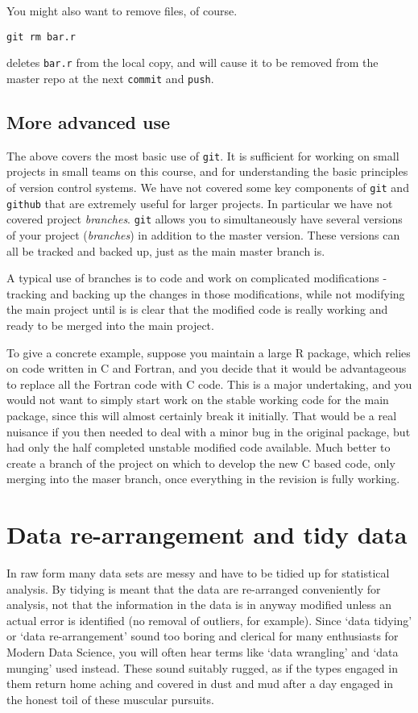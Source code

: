 \documentclass[10pt] {article}
\theoremstyle{definition}
\begin{document}
You might also want to remove files, of course. 
\begin{verbatim}
git rm bar.r
\end{verbatim}
deletes {\tt bar.r} from the local copy, and will cause it to be removed from the master repo at the next {\tt commit} and {\tt push}.

\subsection{More advanced use}

The above covers the most basic use of {\tt git}. It is sufficient for working on small projects in small teams on this course, and for understanding the basic principles of version control systems. We have not covered some key components of  
{\tt git} and {\tt github} that are extremely useful for larger projects. In particular we have not covered project {\em branches}. {\tt git} allows you to simultaneously have several versions of your project ({\em  branches}) in addition to the master version. These versions can all be tracked and backed up, just as the main master branch is. 

A typical use of branches is to code and work on complicated modifications - tracking and backing up the changes in those modifications, while not modifying the main project until is is clear that the modified code is really working and ready to be merged into the main project. 

To give a concrete example, suppose you maintain a large R package, which relies on code written in C and Fortran, and you decide that it would be advantageous to replace all the Fortran code with C code. This is a major undertaking, and you would not want to simply start work on the stable working code for the main package, since this will almost certainly break it initially. That would be a real nuisance if you then needed to deal with a minor bug in the original package, but had only the half completed unstable modified code available. Much better to create a branch of the project on which to develop the new C based code, only merging into the maser branch, once everything in the revision is fully working.  


\section{Data re-arrangement and tidy data}

In raw form many data sets are messy and have to be tidied up for statistical analysis. By tidying is meant that the data are re-arranged conveniently for analysis, not that the information in the data is in anyway modified unless an actual error is identified (no removal of outliers, for example). Since `data tidying' or `data re-arrangement' sound too boring and clerical for many enthusiasts for Modern Data Science, you will often hear terms like `data wrangling' and `data munging' used instead. These sound suitably rugged, as if the types engaged in them return home aching and covered in dust and mud after a day engaged in the honest toil of these muscular pursuits.
\end{document}
